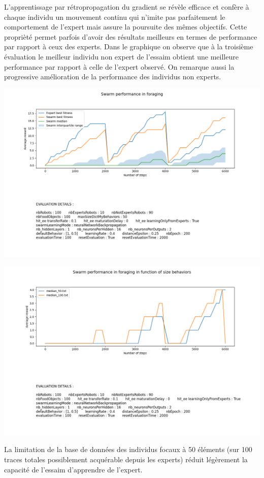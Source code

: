 \documentclass[a4paper, 12pt]{report}
\begin{document}
    L'apprentissage par rétropropagation du gradient se révèle efficace et confère à chaque individu un mouvement continu qui n'imite pas parfaitement le comportement de l'expert mais assure la poursuite des mêmes objectifs. Cette proprièté permet parfois d'avoir des résultats meilleurs en termes de performance par rapport à ceux des experts. 
    Dans le graphique on observe que à la troisième évaluation le meilleur individu non expert de l'essaim obtient une meilleure performance par rapport à celle de l'expert observé. On remarque aussi la progressive amélioration de la performance des individus non experts.


    \includegraphics[scale=0.5]{Compte_Rendu/images/bp6000_50.png}

    \includegraphics[scale=0.5]{Compte_Rendu/images/sizeDB_50vs100_bp.png}

    La limitation de la base de données des individus focaux à 50 éléments (sur 100 traces totales possiblement acquérable depuis les experts) réduit légèrement la capacité de l'essaim d'apprendre de l'expert. 
\end{document}
